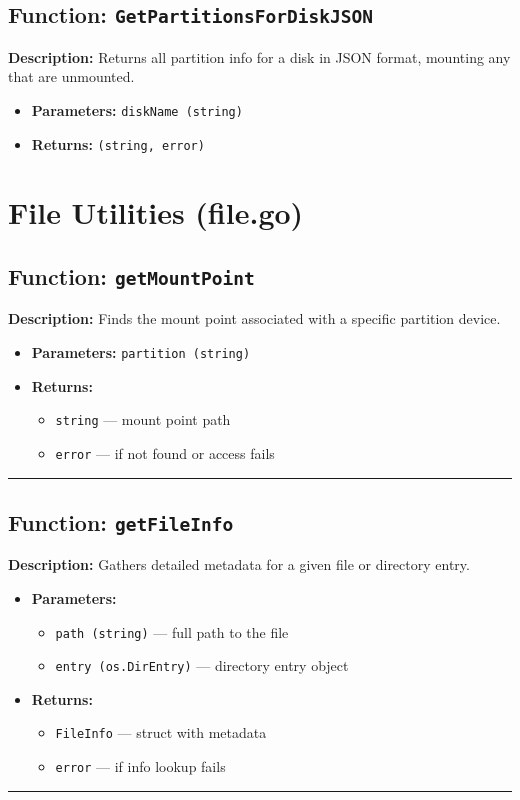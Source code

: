 \documentclass[12pt,a4paper]{article}
\begin{document}
\subsection*{Function: \texttt{GetPartitionsForDiskJSON}}
\textbf{Description:} Returns all partition info for a disk in JSON format, mounting any that are unmounted.
\begin{itemize}[leftmargin=2cm,label={--}]
  \item \textbf{Parameters:} \texttt{diskName (string)}
  \item \textbf{Returns:} \texttt{(string, error)}
\end{itemize}




\newpage

\section{File Utilities (file.go)}

\subsection*{Function: \texttt{getMountPoint}}
\textbf{Description:} Finds the mount point associated with a specific partition device.
\begin{itemize}[leftmargin=2cm,label={--}]
  \item \textbf{Parameters:} \texttt{partition (string)}
  \item \textbf{Returns:}
  \begin{itemize}
    \item \texttt{string} — mount point path
    \item \texttt{error} — if not found or access fails
  \end{itemize}
\end{itemize}
\hrule\vspace{1em}

\subsection*{Function: \texttt{getFileInfo}}
\textbf{Description:} Gathers detailed metadata for a given file or directory entry.
\begin{itemize}[leftmargin=2cm,label={--}]
  \item \textbf{Parameters:}
  \begin{itemize}
    \item \texttt{path (string)} — full path to the file
    \item \texttt{entry (os.DirEntry)} — directory entry object
  \end{itemize}
  \item \textbf{Returns:}
  \begin{itemize}
    \item \texttt{FileInfo} — struct with metadata
    \item \texttt{error} — if info lookup fails
  \end{itemize}
\end{itemize}
\hrule\vspace{1em}
\end{document}

